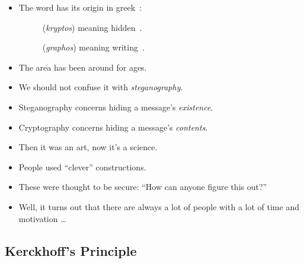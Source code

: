 \begin{frame}
  \begin{itemize}
    \item The word has its origin in greek~:
      \begin{description}
        \item[] (\emph{kryptos}) meaning 
          hidden~.
        \item[] (\emph{graphos}) meaning 
          writing~.
      \end{description}

      \pause{}

    \item The area has been around for ages.

      \pause{}

    \item We should not confuse it with \emph{steganography}.
    \item Steganography concerns hiding a message's \emph{existence}.
    \item Cryptography concerns hiding a message's \emph{contents}.

  \end{itemize}
\end{frame}

\begin{frame}
  \begin{itemize}
    \item Then it was an art, now it's a science.

      \pause{}

    \item People used \enquote{clever} constructions.
    \item These were thought to be secure: \enquote{How can anyone figure this 
        out?}

      \pause{}

    \item Well, it turns out that there are always a lot of people with a lot 
      of time and motivation \dots
  \end{itemize}
\end{frame}

\subsection{Kerckhoff's Principle}

